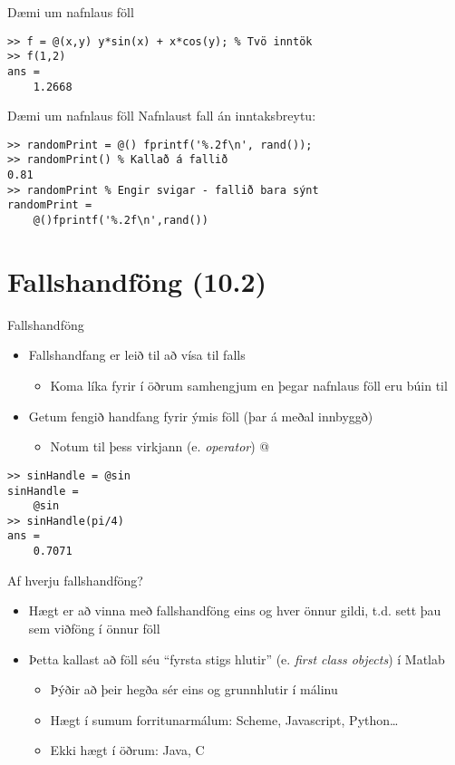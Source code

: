 \documentclass{beamer}
\begin{document}
\begin{frame}[fragile]{Dæmi um nafnlaus föll}
\begin{verbatim}
>> f = @(x,y) y*sin(x) + x*cos(y); % Tvö inntök
>> f(1,2)
ans =
    1.2668
\end{verbatim}
\end{frame}

\begin{frame}[fragile]{Dæmi um nafnlaus föll}
Nafnlaust fall án inntaksbreytu:
\begin{verbatim}
>> randomPrint = @() fprintf('%.2f\n', rand());
>> randomPrint() % Kallað á fallið
0.81
>> randomPrint % Engir svigar - fallið bara sýnt
randomPrint = 
    @()fprintf('%.2f\n',rand())
\end{verbatim}
\end{frame}

\section{Fallshandföng (10.2)}

\begin{frame}[fragile]{Fallshandföng}
\vspace{\baselineskip}
\begin{itemize}
 \item Fallshandfang er leið til að vísa til falls
 \begin{itemize}
  \item Koma líka fyrir í öðrum samhengjum en þegar nafnlaus föll eru búin til
 \end{itemize}
 \item Getum fengið handfang fyrir ýmis föll (þar á meðal innbyggð)
 \begin{itemize}
  \item Notum til þess virkjann (e. \emph{operator}) @
 \end{itemize}
\end{itemize}
\begin{verbatim}
>> sinHandle = @sin
sinHandle = 
    @sin
>> sinHandle(pi/4)
ans =
    0.7071
\end{verbatim}
\end{frame}

\begin{frame}{Af hverju fallshandföng?}
\begin{itemize}
 \item Hægt er að vinna með fallshandföng eins og hver önnur gildi, t.d. sett þau sem viðföng í önnur föll
 \item Þetta kallast að föll séu ``fyrsta stigs hlutir'' (e. \emph{first class objects}) í Matlab
 \begin{itemize}
  \item Þýðir að þeir hegða sér eins og grunnhlutir í málinu
  \item Hægt í sumum forritunarmálum: Scheme, Javascript, Python\ldots
  \item Ekki hægt í öðrum: Java, C
 \end{itemize}
\end{itemize}
\end{frame}
\end{document}
